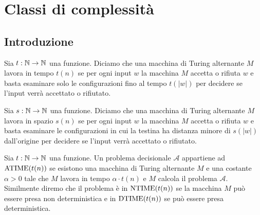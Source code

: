 \chapter{Classi di complessità}

\section{Introduzione}

\begin{definizione}
 Sia $t:\mathbb{N}\to\mathbb{N}$ una funzione. Diciamo che una macchina di Turing alternante
 $M$ lavora in tempo $t(n)$ se per ogni input $w$ la macchina $M$ accetta o
 rifiuta $w$ e basta esaminare solo le configurazioni fino al tempo $t(|w|)$
 per decidere se l'input verrà accettato o rifiutato.
\end{definizione}

\begin{definizione}
\label{def:TM-space}
 Sia $s:\mathbb{N}\to\mathbb{N}$ una funzione. Diciamo che una macchina di Turing alternante
 $M$ lavora in spazio $s(n)$ se per ogni input $w$
 la macchina $M$ accetta o
 rifiuta $w$ e basta esaminare le configurazioni in cui la testina
 ha distanza minore di $s(|w|)$ dall'origine
 per decidere se l'input verrà accettato o rifiutato.
\end{definizione}



\begin{definizione}
 Sia $t:\mathbb{N}\to\mathbb{N}$ una funzione.
 Un problema decisionale $\mathcal{A}$ appartiene ad $\operatorname{ATIME}(t(n))$ se esistono una macchina
 di Turing alternante $M$ e una costante $\alpha>0$ tale che $M$ lavora in tempo
 $\alpha \cdot t(n)$ e $M$ calcola il problema $\mathcal{A}$. Similmente diremo che
 il problema è in $\operatorname{NTIME}(t(n))$ se la macchina $M$ può essere presa non
 deterministica e in $\operatorname{DTIME}(t(n))$ se può essere presa deterministica.
\end{definizione}

